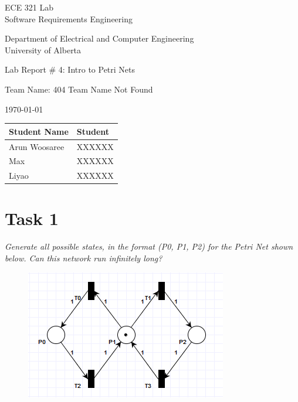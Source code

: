 \documentclass[letterpaper]{article}
\begin{document}
\begin{titlepage}
 \begin{center}

  \LARGE
  ECE 321 Lab\\ Software Requirements Engineering

  Department of Electrical and Computer Engineering\\

  University of Alberta

  \vspace{2cm}

  Lab Report \# 4: Intro to Petri Nets

  \vspace{2cm}

  Team Name: 404 Team Name Not Found

  \vspace{2cm}

  \today

  \vspace{2cm}
  \Large

  \begin{tabular}{ | m{5cm} | m{5cm} | }
   \hline
   Student Name  & Student \\
   \hline
   Arun Woosaree & XXXXXX  \\
   \hline
   Max           & XXXXXX  \\
   \hline
   Liyao         & XXXXXX  \\
   \hline
  \end{tabular}



 \end{center}
\end{titlepage}


\section{Task 1}

\textit{Generate all possible states, in the format (P0, P1, P2) for the Petri Net shown below. Can this network run infinitely long?}

\begin{figure}[H]
 \centering
 \includegraphics[width=\textwidth]{image1.png}
\end{figure}
\end{document}
